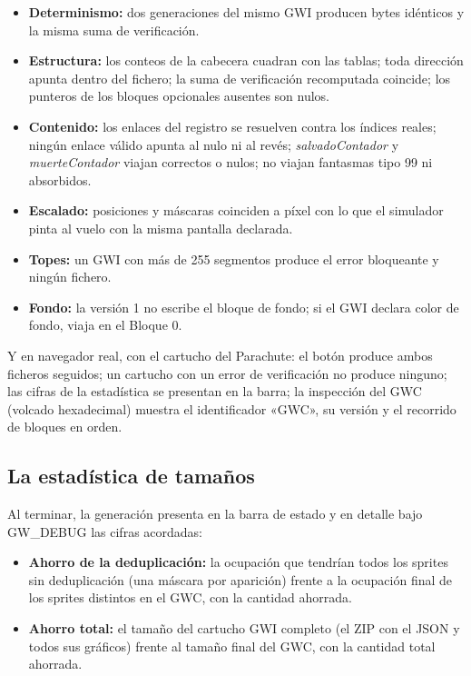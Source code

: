 \begin{itemize}
	\item \textbf{Determinismo:} dos generaciones del mismo GWI
	producen bytes idénticos y la misma suma de verificación.
	\item \textbf{Estructura:} los conteos de la cabecera cuadran con
	las tablas; toda dirección apunta dentro del fichero; la suma de
	verificación recomputada coincide; los punteros de los bloques
	opcionales ausentes son nulos.
	\item \textbf{Contenido:} los enlaces del registro se resuelven
	contra los índices reales; ningún enlace válido apunta al nulo ni
	al revés; \emph{salvadoContador} y \emph{muerteContador} viajan
	correctos o nulos; no viajan fantasmas tipo 99 ni absorbidos.
	\item \textbf{Escalado:} posiciones y máscaras coinciden a píxel
	con lo que el simulador pinta al vuelo con la misma pantalla
	declarada.
	\item \textbf{Topes:} un GWI con más de 255 segmentos produce el
	error bloqueante y ningún fichero.
	\item \textbf{Fondo:} la versión 1 no escribe el bloque de fondo;
	si el GWI declara color de fondo, viaja en el Bloque 0.
\end{itemize}

Y en navegador real, con el cartucho del Parachute: el botón produce
ambos ficheros seguidos; un cartucho con un error de verificación no
produce ninguno; las cifras de la estadística se presentan en la
barra; la inspección del GWC (volcado hexadecimal) muestra el
identificador «GWC», su versión y el recorrido de bloques en orden.

\subsection{La estadística de tamaños}
\label{sec:F5I3Estadistica}

Al terminar, la generación presenta en la barra de estado y en
detalle bajo GW\_DEBUG las cifras acordadas:

\begin{itemize}
	\item \textbf{Ahorro de la deduplicación:} la ocupación que
	tendrían todos los sprites sin deduplicación (una máscara por
	aparición) frente a la ocupación final de los sprites distintos en
	el GWC, con la cantidad ahorrada.
	\item \textbf{Ahorro total:} el tamaño del cartucho GWI completo
	(el ZIP con el JSON y todos sus gráficos) frente al tamaño final
	del GWC, con la cantidad total ahorrada.
\end{itemize}

